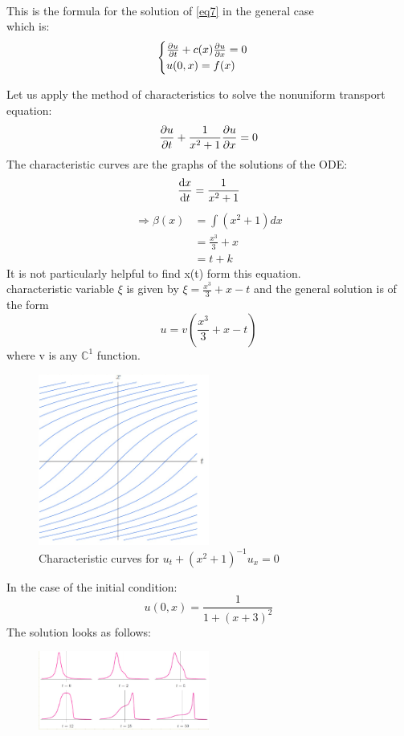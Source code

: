 \\This is the formula for the solution of  \eqref{eq7} in the general case
\\which is:$$\begin{cases}
\pdv{u}{t}+c(x)\pdv{u}{x}=0
\\u(0,x)=f(x)
\end{cases}
$$ 
\begin{example}{}{}
Let us apply the method of characteristics to solve the nonuniform transport equation:
$$
    \pdv{u}{t}+\frac{1}{x^2+1}\pdv{u}{x}=0
$$ 
The characteristic curves are the graphs of the solutions of the ODE:
$$
    \dv{x}{t}=\frac{1}{x^2+1}
$$ 
\begin{align*}
    \Rightarrow \beta(x)&=\int(x^2+1)dx\\
    &=\frac{x^3}{3}+x\\
    &=t+k
\end{align*}
It is not particularly helpful to find x(t) form this equation.\\
characteristic variable $ \xi $ is given by $ \xi=\frac{x^3}{3}+x-t $ and the general solution is of the form
$$
    u=v(\frac{x^3}{3}+x-t)
$$  
where v is any $ \mathbb{C}^1 $ function.\\
\begin{figure}[H]
    \centering
    \includegraphics[height = 0.4\textwidth, width = 0.5\textwidth]{resource/2.png}
    \caption{Characteristic curves for $u_t+(x^2+1)^{-1}u_x=0$}
	\label{img:chcurve}
\end{figure}
In the case of the initial condition:
$$
    u(0,x)=\frac{1}{1+{(x+3)}^2}
$$  
The solution looks as follows:
\begin{figure}[H]
    \centering
    \includegraphics[height = 0.4\textwidth, width = 0.5\textwidth]{resource/3.png}
\end{figure}
\end{example}
